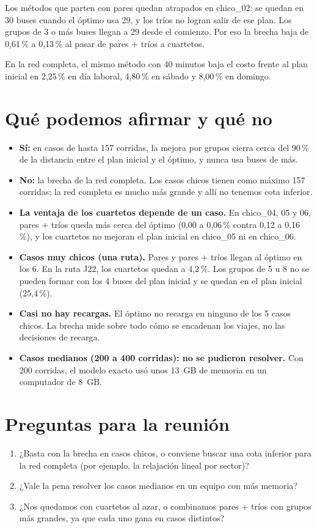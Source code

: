 \documentclass[11pt,a4paper]{article}
\begin{document}
Los métodos que parten con pares quedan atrapados en chico\_02: se quedan en 30 buses
cuando el óptimo usa 29, y los tríos no logran salir de ese plan. Los grupos de 3 o más
buses llegan a 29 desde el comienzo. Por eso la brecha baja de 0,61\,\% a 0,13\,\% al
pasar de pares + tríos a cuartetos.

En la red completa, el mismo método con 40 minutos baja el costo frente al plan inicial
en 2,25\,\% en día laboral, 4,80\,\% en sábado y 8,00\,\% en domingo.

\section{Qué podemos afirmar y qué no}
\begin{itemize}
  \item \textbf{Sí:} en casos de hasta 157 corridas, la mejora por grupos cierra cerca
    del 90\,\% de la distancia entre el plan inicial y el óptimo, y nunca usa buses de
    más.
  \item \textbf{No:} la brecha de la red completa. Los casos chicos tienen como máximo
    157 corridas; la red completa es mucho más grande y allí no tenemos cota inferior.
  \item \textbf{La ventaja de los cuartetos depende de un caso.} En chico\_04, 05 y 06,
    pares + tríos queda más cerca del óptimo (0,00 a 0,06\,\% contra 0,12 a 0,16\,\%), y
    los cuartetos no mejoran el plan inicial en chico\_05 ni en chico\_06.
  \item \textbf{Casos muy chicos (una ruta).} Pares y pares + tríos llegan al óptimo en
    los 6. En la ruta J22, los cuartetos quedan a 4,2\,\%. Los grupos de 5 u 8 no se
    pueden formar con los 4 buses del plan inicial y se quedan en el plan inicial (25,4\,\%).
  \item \textbf{Casi no hay recargas.} El óptimo no recarga en ninguno de los 5 casos
    chicos. La brecha mide sobre todo cómo se encadenan los viajes, no las decisiones
    de recarga.
  \item \textbf{Casos medianos (200 a 400 corridas): no se pudieron resolver.} Con 200
    corridas, el modelo exacto usó unos 13~GB de memoria en un computador de 8~GB.
\end{itemize}

\section{Preguntas para la reunión}
\begin{enumerate}
  \item ¿Basta con la brecha en casos chicos, o conviene buscar una cota inferior
    para la red completa (por ejemplo, la relajación lineal por sector)?
  \item ¿Vale la pena resolver los casos medianos en un equipo con más memoria?
  \item ¿Nos quedamos con cuartetos al azar, o combinamos pares + tríos con grupos más
    grandes, ya que cada uno gana en casos distintos?
\end{enumerate}
\end{document}
